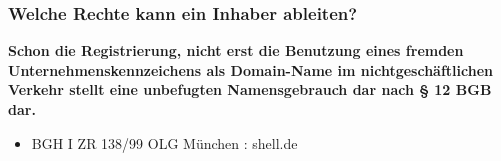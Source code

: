 \documentclass{beamer}
\begin{document}
	\begin{frame}
		\frametitle{Welche Rechte kann ein Inhaber ableiten?}
		\textbf{Schon die Registrierung, nicht erst die Benutzung eines fremden Unternehmenskennzeichens als Domain-Name im nichtgeschäftlichen Verkehr stellt eine unbefugten Namensgebrauch dar nach § 12 BGB dar.}
		\begin{itemize}
			\item BGH I ZR 138/99 OLG München : shell.de
		\end{itemize}
		
	\end{frame}
	
\end{document}
